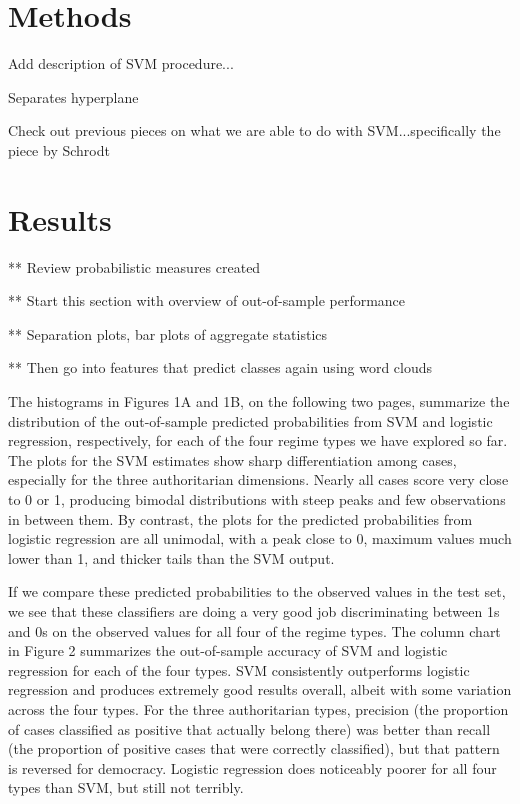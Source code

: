 \documentclass[pdftex,12pt,fullpage,oneside]{amsart}
\begin{document}
\section{Methods}

Add description of SVM procedure...

Separates hyperplane

Check out previous pieces on what we are able to do with SVM...specifically the piece by Schrodt

\section{Results}

** Review probabilistic measures created

** Start this section with overview of out-of-sample performance

** Separation plots, bar plots of aggregate statistics

** Then go into features that predict classes again using word clouds

The histograms in Figures 1A and 1B, on the following two pages, summarize the distribution of the out-of-sample predicted probabilities from SVM and logistic regression, respectively, for each of the four regime types we have explored so far.  The plots for the SVM estimates show sharp differentiation among cases, especially for the three authoritarian dimensions. Nearly all cases score very close to 0 or 1, producing bimodal distributions with steep peaks and few observations in between them. By contrast, the plots for the predicted probabilities from logistic regression are all unimodal, with a peak close to 0, maximum values much lower than 1, and thicker tails than the SVM output. 

If we compare these predicted probabilities to the observed values in the test set, we see that these classifiers are doing a very good job discriminating between 1s and 0s on the observed values for all four of the regime types. The column chart in Figure 2 summarizes the out-of-sample accuracy of SVM and logistic regression for each of the four types. SVM consistently outperforms logistic regression and produces extremely good results overall, albeit with some variation across the four types. For the three authoritarian types, precision (the proportion of cases classified as positive that actually belong there) was better than recall (the proportion of positive cases that were correctly classified), but that pattern is reversed for democracy. Logistic regression does noticeably poorer for all four types than SVM, but still not terribly.
\end{document}
